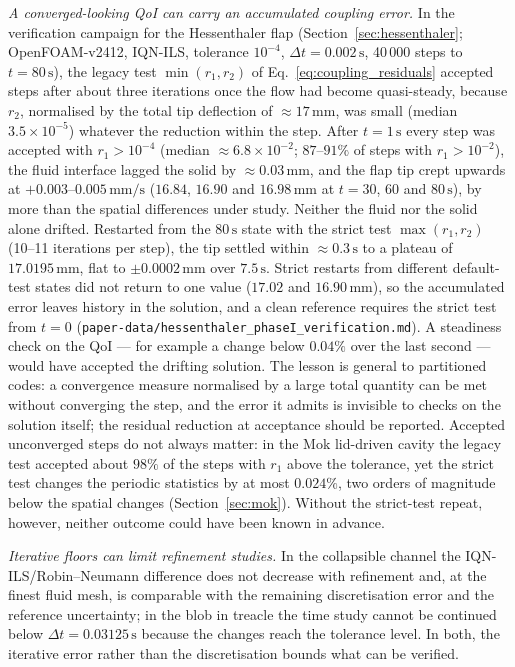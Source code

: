 \emph{A converged-looking QoI can carry an accumulated coupling error.}
In the verification campaign for the Hessenthaler flap (Section~\ref{sec:hessenthaler}; OpenFOAM-v2412, IQN-ILS, tolerance $10^{-4}$, $\Delta t = 0.002\,\mathrm{s}$, 40\,000 steps to $t = 80\,\mathrm{s}$), the legacy test $\min(r_1, r_2)$ of Eq.~\eqref{eq:coupling_residuals} accepted steps after about three iterations once the flow had become quasi-steady, because $r_2$, normalised by the total tip deflection of $\approx17\,\mathrm{mm}$, was small (median $3.5\times10^{-5}$) whatever the reduction within the step.
After $t = 1\,\mathrm{s}$ every step was accepted with $r_1 > 10^{-4}$ (median $\approx6.8\times10^{-2}$; $87$--$91\%$ of steps with $r_1 > 10^{-2}$), the fluid interface lagged the solid by $\approx0.03\,\mathrm{mm}$, and the flap tip crept upwards at $+0.003$--$0.005\,\mathrm{mm/s}$ ($16.84$, $16.90$ and $16.98\,\mathrm{mm}$ at $t = 30$, $60$ and $80\,\mathrm{s}$), by more than the spatial differences under study.
Neither the fluid nor the solid alone drifted.
Restarted from the $80\,\mathrm{s}$ state with the strict test $\max(r_1, r_2)$ (10--11 iterations per step), the tip settled within $\approx0.3\,\mathrm{s}$ to a plateau of $17.0195\,\mathrm{mm}$, flat to $\pm0.0002\,\mathrm{mm}$ over $7.5\,\mathrm{s}$.
Strict restarts from different default-test states did not return to one value ($17.02$ and $16.90\,\mathrm{mm}$), so the accumulated error leaves history in the solution, and a clean reference requires the strict test from $t = 0$ (\texttt{paper-data/hessenthaler\_phaseI\_verification.md}).
A steadiness check on the QoI --- for example a change below $0.04\%$ over the last second --- would have accepted the drifting solution.
The lesson is general to partitioned codes: a convergence measure normalised by a large total quantity can be met without converging the step, and the error it admits is invisible to checks on the solution itself; the residual reduction at acceptance should be reported.
Accepted unconverged steps do not always matter: in the Mok lid-driven cavity the legacy test accepted about $98\%$ of the steps with $r_1$ above the tolerance, yet the strict test changes the periodic statistics by at most $0.024\%$, two orders of magnitude below the spatial changes (Section~\ref{sec:mok}). Without the strict-test repeat, however, neither outcome could have been known in advance.


\emph{Iterative floors can limit refinement studies.}
In the collapsible channel the IQN-ILS/Robin--Neumann difference does not decrease with refinement and, at the finest fluid mesh, is comparable with the remaining discretisation error and the reference uncertainty; in the blob in treacle the time study cannot be continued below $\Delta t = 0.03125\,\mathrm{s}$ because the changes reach the tolerance level.
In both, the iterative error rather than the discretisation bounds what can be verified.

